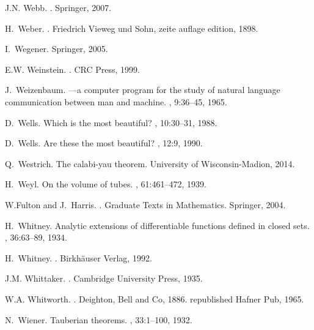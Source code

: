 \documentclass[12pt]{amsart}
\begin{document}
\begin{thebibliography}{100}
J.N. Webb.
.
\newblock Springer, 2007.

H.~Weber.
.
\newblock Friedrich Vieweg und Sohn, zeite auflage edition, 1898.

I.~Wegener.
\newblock Springer, 2005.

E.W. Weinstein.
.
\newblock CRC Press, 1999.

J.~Weizenbaum.
---a computer program for the study of natural language
  communication between man and machine.
, 9:36--45, 1965.

D.~Wells.
\newblock Which is the most beautiful?
, 10:30--31, 1988.

D.~Wells.
\newblock Are these the most beautiful?
, 12:9, 1990.

Q.~Westrich.
\newblock The calabi-yau theorem.
\newblock University of Wisconsin-Madion, 2014.

H.~Weyl.
\newblock On the volume of tubes.
, 61:461--472, 1939.

W.Fulton and J.~Harris.
.
\newblock Graduate Texts in Mathematics. Springer, 2004.

H.~Whitney.
\newblock Analytic extensions of differentiable functions defined in closed
  sets.
, 36:63--89, 1934.

H.~Whitney.
.
\newblock Birk{h\"a}user Verlag, 1992.

J.M. Whittaker.
.
\newblock Cambridge University Press, 1935.

W.A. Whitworth.
.
\newblock Deighton, Bell and Co, 1886.
\newblock republished Hafner Pub, 1965.

N.~Wiener.
\newblock Tauberian theorems.
, 33:1--100, 1932.


\end{thebibliography}
\end{document}
